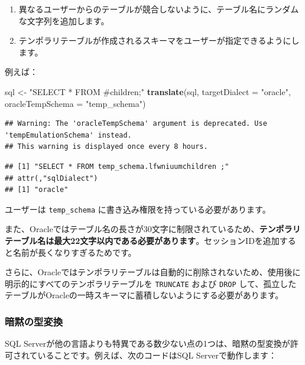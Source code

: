 \documentclass[
  11pt]{book}
\newenvironment{Shaded}{\begin{snugshade}}{\end{snugshade}}
\newcommand{\AttributeTok}[1]{\textcolor[rgb]{0.13,0.29,0.53}{#1}}
\newcommand{\FunctionTok}[1]{\textcolor[rgb]{0.13,0.29,0.53}{\textbf{#1}}}
\newcommand{\NormalTok}[1]{#1}
\newcommand{\OtherTok}[1]{\textcolor[rgb]{0.56,0.35,0.01}{#1}}
\newcommand{\StringTok}[1]{\textcolor[rgb]{0.31,0.60,0.02}{#1}}
\providecommand{\tightlist}{%
  \setlength{\itemsep}{0pt}\setlength{\parskip}{0pt}}
\theoremstyle{definition}
\theoremstyle{definition}
\theoremstyle{definition}
\theoremstyle{definition}
\theoremstyle{remark}
\begin{document}
\begin{enumerate}
\def\labelenumi{\arabic{enumi}.}
\tightlist
\item
  異なるユーザーからのテーブルが競合しないように、テーブル名にランダムな文字列を追加します。
\item
  テンポラリテーブルが作成されるスキーマをユーザーが指定できるようにします。
\end{enumerate}

例えば：

\begin{Shaded}
\begin{Highlighting}[]
\NormalTok{sql }\OtherTok{\textless{}{-}} \StringTok{"SELECT * FROM \#children;"}
\FunctionTok{translate}\NormalTok{(sql, }\AttributeTok{targetDialect =} \StringTok{"oracle"}\NormalTok{, }\AttributeTok{oracleTempSchema =} \StringTok{"temp\_schema"}\NormalTok{)}
\end{Highlighting}
\end{Shaded}

\begin{verbatim}
## Warning: The 'oracleTempSchema' argument is deprecated. Use 'tempEmulationSchema' instead.
## This warning is displayed once every 8 hours.
\end{verbatim}

\begin{verbatim}
## [1] "SELECT * FROM temp_schema.lfwniuumchildren ;"
## attr(,"sqlDialect")
## [1] "oracle"
\end{verbatim}

ユーザーは \texttt{temp\_schema} に書き込み権限を持っている必要があります。

また、Oracleではテーブル名の長さが30文字に制限されているため、\textbf{テンポラリテーブル名は最大22文字以内である必要があります}。セッションIDを追加すると名前が長くなりすぎるためです。

さらに、Oracleではテンポラリテーブルは自動的に削除されないため、使用後に明示的にすべてのテンポラリテーブルを \texttt{TRUNCATE} および \texttt{DROP} して、孤立したテーブルがOracleの一時スキーマに蓄積しないようにする必要があります。

\subsubsection*{暗黙の型変換}\label{ux6697ux9ed9ux306eux578bux5909ux63db}

SQL Serverが他の言語よりも特異である数少ない点の1つは、暗黙の型変換が許可されていることです。例えば、次のコードはSQL Serverで動作します：
\end{document}
